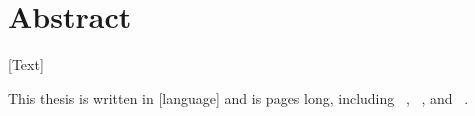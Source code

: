 \section*{\centering Abstract}

[Text]

This thesis is written in [language] and is \pageref*{EndOfMainPart}
pages long, including \totalchapters\ , \totalfigures\ ,\linebreak
and \totaltables\ .

\pagebreak

